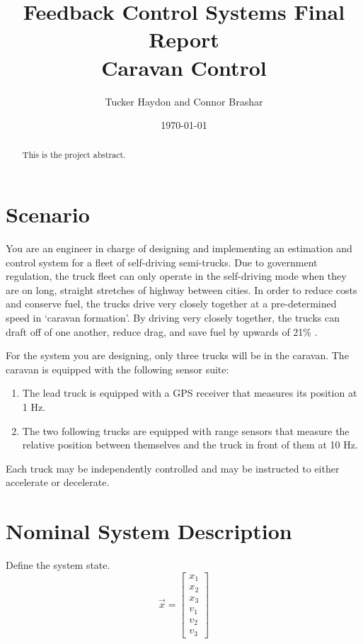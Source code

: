 \documentclass[12pt,onecolumn,reqno]{amsart}
\begin{document}
\title[]{Feedback Control Systems Final Report \\ Caravan Control}
\author[]{Tucker Haydon and Connor Brashar}
\address{The University of Texas at Austin}
\date{\today}
\begin{abstract}
  This is the project abstract.
\end{abstract}
\maketitle


\section{Scenario}
You are an engineer in charge of designing and implementing an estimation and
control system for a fleet of self-driving semi-trucks. Due to government
regulation, the truck fleet can only operate in the self-driving mode when they
are on long, straight stretches of highway between cities. In order to reduce
costs and conserve fuel, the trucks drive very closely together at a
pre-determined speed in `caravan formation'. By driving very closely together,
the trucks can draft off of one another, reduce drag, and save fuel by upwards
of 21\% \cite{bonnet2000fuel}.

For the system you are designing, only three trucks will be in the caravan. The
caravan is equipped with the following sensor suite: 
\begin{enumerate}
  \item The lead truck is equipped with a GPS receiver that measures its
    position at 1 Hz.
  \item The two following trucks are equipped with range sensors that measure
    the relative position between themselves and the truck in front of them at
    10 Hz.
\end{enumerate}

Each truck may be independently controlled and may be instructed to either
accelerate or decelerate.

\section{Nominal System Description}
\label{sec:nominal_system}

Define the system state.
\begin{equation}
  \vec{x} = 
  \begin{bmatrix}
    x_{1} \\
    x_{2} \\
    x_{3} \\
    v_{1} \\
    v_{2} \\
    v_{3}
  \end{bmatrix}
\end{equation}
\end{document}
